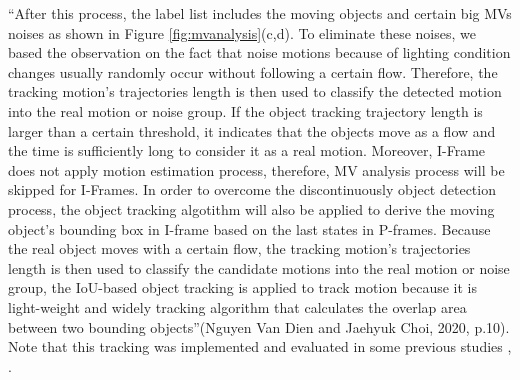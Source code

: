 “After this process, the label list includes the moving objects and certain big MVs noises as shown in Figure \ref{fig:mvanalysis}(c,d). To eliminate these noises, we based the observation on the fact that noise motions because of lighting condition changes usually randomly occur without following a certain flow. Therefore, the tracking motion’s trajectories length is then used to classify the detected motion into the real motion or noise group. If the object tracking trajectory length is larger than a certain threshold, it indicates that the objects move as a flow and the time is sufficiently long to consider it as a real motion. Moreover, I-Frame does not apply motion estimation process, therefore, MV analysis process will be skipped for I-Frames. In order to overcome the discontinuously object detection process, the object tracking algotithm will also be applied to derive the moving object's bounding box in I-frame based on the last states in P-frames. Because the real object moves with a certain flow, the tracking
motion’s trajectories length is then used to classify the candidate
motions into the real motion or noise group, the IoU-based object tracking is applied to track motion because it is light-weight and widely tracking algorithm that calculates the overlap area between two bounding objects”(Nguyen Van Dien and Jaehyuk Choi, 2020, p.10). Note that this tracking was implemented and evaluated in some previous studies  \cite{sheu2019stam}, \cite{li2020hksiamfc}. 
